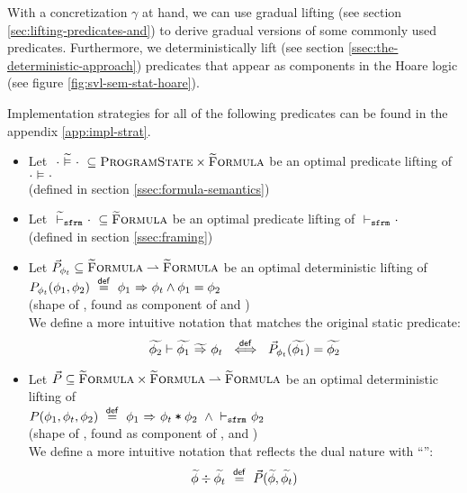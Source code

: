 With a concretization $\gamma$ at hand, we can use gradual lifting (see section \ref{sec:lifting-predicates-and}) to derive gradual versions of some commonly used predicates.
Furthermore, we deterministically lift (see section \ref{ssec:the-deterministic-approach}) predicates that appear as components in the Hoare logic (see figure \ref{fig:svl-sem-stat-hoare}).

Implementation strategies for all of the following predicates can be found in the appendix \ref{app:impl-strat}.

\begin{itemize}
    \item 
    Let $~\evalgphiGen{\cdot}{\cdot}~ \subseteq \setProgramState \times \setGFormula$ be an optimal predicate lifting of $\evalphiGen{\cdot}{\cdot}$ 
    \\(defined in section \ref{ssec:formula-semantics})
    
    \item 
    Let $~\sfrmgphi \cdot~ \subseteq \setGFormula$ be an optimal predicate lifting of $\sfrmphi \cdot$ 
    \\(defined in section \ref{ssec:framing})
    
    \item 
    Let $\dgrad{P}_{\phi_t} \subseteq \setGFormula \rightharpoonup \setGFormula$ be an optimal deterministic lifting of 
    \\$P_{\phi_t}(\phi_1, \phi_2) ~\defeq~ \phiImplies{\phi_1}{\phi_t} \wedge \phi_1 = \phi_2$ 
    \\(shape of , found as component of  and )
    \\We define a more intuitive notation that matches the original static predicate:
    \begin{displaymath}
    \gphiImpliesEv{\grad{\phi_1}}{\phi_t}{\grad{\phi_2}} ~\defiff~ \dgrad{P}_{\phi_t}(\grad{\phi_1}) = \grad{\phi_2}
    \end{displaymath}
    
    \item 
    Let $\dgrad{P} \subseteq \setGFormula \times \setGFormula \rightharpoonup \setGFormula$ be an optimal deterministic lifting of 
    \\$P(\phi_1, \phi_t, \phi_2) ~\defeq~ \phiImplies{\phi_1}{\phiCons{$\phi_t$}{$\phi_2$}} ~\wedge \sfrmphi \phi_2$ 
    \\(shape of , found as component of ,  and )
    \\We define a more intuitive notation that reflects the dual nature with “\ttt{*}”:
    \begin{displaymath}
    \wo{\grad{\phi}}{\grad{\phi_t}} ~\defeq~ \dgrad{P}(\grad{\phi}, \grad{\phi_t})
    \end{displaymath}
\end{itemize}



